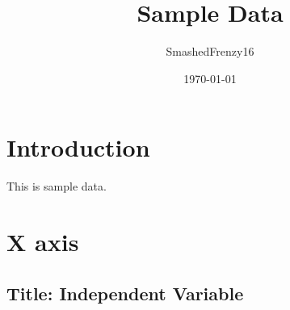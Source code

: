 \documentclass[a4paper, 12pt]{article}
\begin{document}
\title{Sample Data}
\author{SmashedFrenzy16}
\date{\today}
\maketitle


\section{Introduction}

This is sample data.

\section{X axis}

\subsection{Title: Independent Variable}
\end{document}
